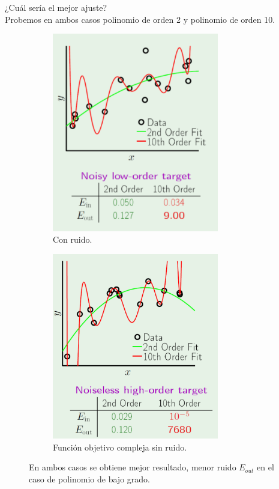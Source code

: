 \documentclass[11pt,a4paper]{article}
\theoremstyle{definition}
\begin{document}
	¿Cuál sería el mejor ajuste?\\
	
	Probemos en ambos casos polinomio de orden 2 y polinomio de orden 10.
	
	\begin{figure}[H]
		\centering
		\begin{subfigure}{.5\textwidth}
  		\centering
  		\includegraphics[width=0.8\textwidth]{images/case_study1}
  		\caption{Con ruido.}
  		\label{fig:sub1}
		\end{subfigure}%
		\begin{subfigure}{.5\textwidth}
  		\centering
  		\includegraphics[width=0.8\textwidth]{images/case_study2}
  		\caption{Función objetivo compleja sin ruido.}
  		\label{fig:sub2}
		\end{subfigure}
		\caption{En ambos casos se obtiene mejor resultado, menor ruido $E_{out}$ en el caso de polinomio de bajo grado.}
		\label{fig:test}
	\end{figure}
\end{document}
